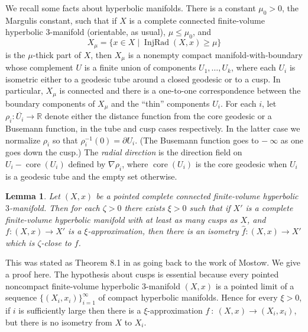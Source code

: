 \documentclass[12pt]{amsart}
\newcommand{\core}{\operatorname{core}}
\newcommand{\D}{\partial}
\newcommand{\injrad}{\operatorname{InjRad}}
\newcommand{\R}{{\mathbb R}}
\newcommand{\ol}{\overline}
\newcommand{\ra}{\rightarrow}
\numberwithin{equation}{section}
\theoremstyle{plain}
\newtheorem{lemma}[equation]{Lemma}
\theoremstyle{definition}
\theoremstyle{remark}
\begin{document}
We  recall some facts about hyperbolic manifolds. 
There is a constant $\mu_0>0$, the Margulis constant,
such that if $X$ is a complete connected finite-volume
hyperbolic $3$-manifold (orientable, as usual), $\mu\leq \mu_0$, and  
\begin{equation}
X_\mu=\{x\in X\mid \injrad(X,x)\geq \mu\}
\end{equation}
is the $\mu$-thick part of $X$, then $X_\mu$ is a nonempty 
compact manifold-with-boundary whose complement $U$
is a finite union of components $U_1,\ldots,U_k$,
where each $U_i$ is isometric either to a geodesic tube
around a closed geodesic or to  a cusp. 
In particular, $X_\mu$ is connected and there is a one-to-one
correspondence between the boundary components of $X_\mu$
and the ``thin'' components $U_i$.   For each $i$,
let $\rho_i:\ol{U_i}\ra\R$ denote either the distance function
from the core geodesic or a Busemann function, in the
tube and cusp cases respectively. In the latter case 
we normalize $\rho_i$ so that $\rho_i^{-1}(0)=\D U_i$.  (The
Busemann function goes to $- \: \infty$ as one goes down
the cusp.)
The {\em radial direction}
is the direction field on $U_i -  \core(U_i)$
defined by $\nabla\rho_i$, where $\core(U_i)$ is the core
geodesic when $U_i$ is a geodesic tube and the empty set otherwise.

\begin{lemma}
\label{prasad}
Let $(X,x)$ be a pointed complete connected finite-volume hyperbolic
$3$-manifold.  Then for each $\zeta>0$ there exists $\xi>0$
such that if $X'$ is a complete finite-volume hyperbolic
manifold with at least as many cusps as $X$,
and $f:(X,x)\ra X'$ is a $\xi$-approximation, then there is an 
isometry $\hat f: (X,x)\ra X'$ which 
is $\zeta$-close to $f$.
\end{lemma}
This was stated as Theorem 8.1 in \cite{Hamiltonn} as going 
back to the work of Mostow. We give a proof here.
The hypothesis about cusps is essential because every pointed noncompact
finite-volume hyperbolic $3$-manifold $(X,x)$ is a pointed limit of a sequence
$\{(X_i,x_i)\}_{i=1}^\infty$ 
of compact hyperbolic manifolds. 
Hence for every $\xi > 0$, if $i$ is sufficiently large then there is a
$\xi$-approximation $f \: : \: (X, x) \rightarrow (X_i, x_i)$, but there is
no isometry from $X$ to $X_i$. 
\end{document}
